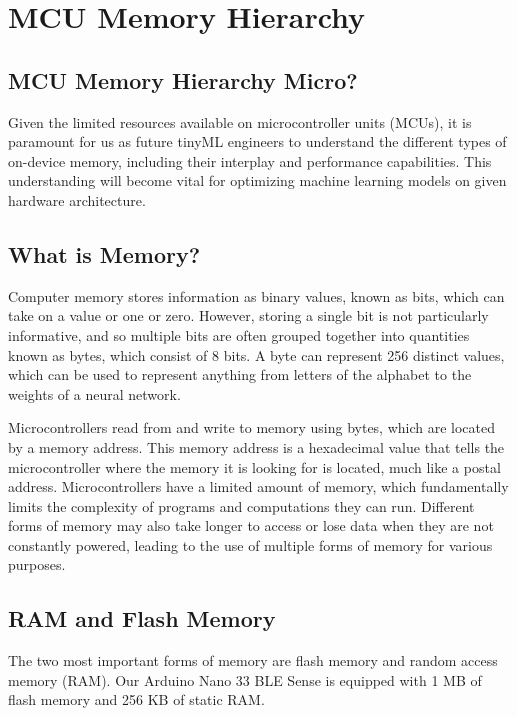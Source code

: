   
\section{MCU Memory Hierarchy}

 
\subsection{MCU Memory Hierarchy Micro?}

    Given the limited resources available on microcontroller units (MCUs), it is paramount for us as future tinyML engineers to understand the different types of on-device memory, including their interplay and performance capabilities. This understanding will become vital for optimizing machine learning models on given hardware architecture.
    
\subsection{What is Memory?}

    Computer memory stores information as binary values, known as bits, which can take on a value or one or zero. However, storing a single bit is not particularly informative, and so multiple bits are often grouped together into quantities known as bytes, which consist of 8 bits. A byte can represent 256 distinct values, which can be used to represent anything from letters of the alphabet to the weights of a neural network.
    
    Microcontrollers read from and write to memory using bytes, which are located by a memory address. This memory address is a hexadecimal value that tells the microcontroller where the memory it is looking for is located, much like a postal address. Microcontrollers have a limited amount of memory, which fundamentally limits the complexity of programs and computations they can run. Different forms of memory may also take longer to access or lose data when they are not constantly powered, leading to the use of multiple forms of memory for various purposes.
    
\subsection{RAM and Flash Memory}

    The two most important forms of memory are flash memory and random access memory (RAM). Our Arduino Nano 33 BLE Sense is equipped with 1 MB of flash memory and 256 KB of static RAM.
    
